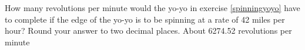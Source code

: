 {How many revolutions per minute would the yo-yo in exercise \ref{spinningyoyo} have to complete if the edge of the yo-yo is to be spinning at a rate of 42 miles per hour?  Round your answer to two decimal places.}
{About 6274.52 revolutions per minute}